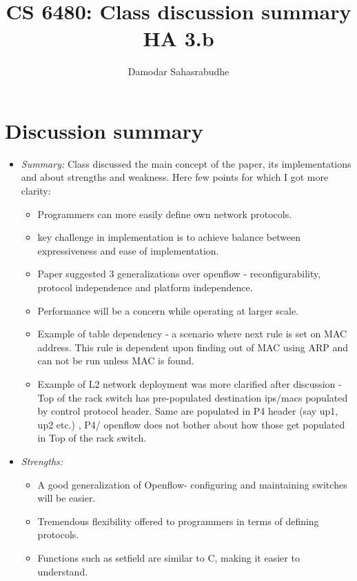 \documentclass[letterpaper,twocolumn,10pt]{article}
\title{CS 6480: Class discussion summary\\
HA 3.b\\}
\author{Damodar Sahasrabudhe}
\affil{School of Computing, University of Utah}
\begin{document}
\maketitle
\section*{Discussion summary}

\begin{itemize}

\item {\it Summary:} 
Class discussed the main concept of the paper, its implementations and about strengths and weakness. Here few points for which I got more clarity:
\begin{itemize}
\item Programmers can more easily define own network protocols.
\item key challenge in implementation is  to achieve balance between expressiveness and ease of implementation.
\item Paper suggested 3 generalizations over openflow - reconfigurability, protocol independence and platform independence.
\item Performance will be a concern while operating at larger scale.
\item Example of table dependency - a scenario where next rule is set on MAC address. This rule is dependent upon finding out of MAC using ARP and can not be run unless MAC is found.
\item Example of L2 network deployment was more clarified after discussion - Top of the rack switch has  pre-populated destination ips/macs populated by control protocol header. Same  are populated in P4 header (say up1, up2 etc.) , P4/ openflow does not bother about how those get populated in Top of the rack switch.

\end{itemize} 

\item {\it Strengths:} 
\begin{itemize}
\item A good generalization of Openflow- configuring and maintaining switches will be easier.
\item Tremendous flexibility offered to programmers in terms of defining protocols.
\item Functions such as setfield are similar to C, making it easier to understand.
\end{itemize}


\end{itemize}
\end{document}
